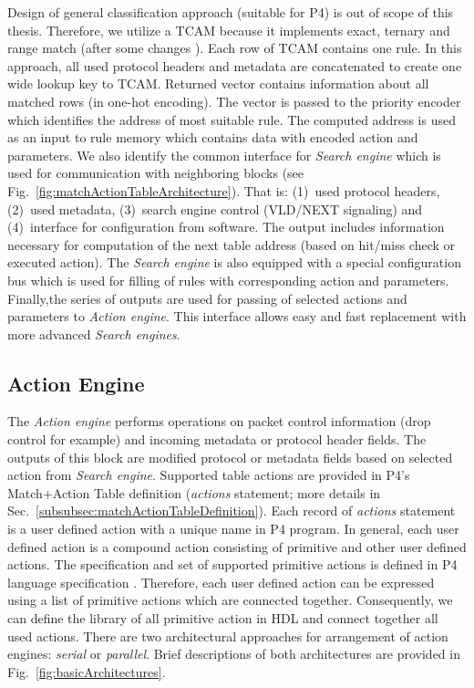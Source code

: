 Design of general classification approach (suitable for P4) is out of scope of this thesis. 
Therefore, we utilize a TCAM because
it implements exact, ternary and range match (after some changes \cite{MeinersClasssificationBook}).
Each row of TCAM contains one rule. In this approach, all used protocol headers and metadata are concatenated to create one wide lookup key to TCAM. 
Returned vector contains information about all matched rows (in one-hot encoding).
The vector is passed to the priority encoder which identifies the address of most suitable rule. The computed address is used as an input to rule memory 
which contains data with encoded action and parameters. 
We also identify the common interface for \textit{Search engine}
which is used for communication with neighboring blocks (see Fig.~\ref{fig:matchActionTableArchitecture}).
That is: (1)~used protocol headers, (2)~used metadata, (3)~search engine control (VLD/NEXT signaling) and (4)~interface for configuration from software. 
The output includes information necessary for computation of the next table address (based on hit/miss check or executed action). 
The \textit{Search engine} is also equipped with a special configuration bus which is used for filling of rules with corresponding action and parameters.
Finally,the series of outputs are used for passing of selected actions and parameters to \textit{Action engine}. This interface allows easy
and fast replacement with more advanced \textit{Search engines}. 

\subsection{Action Engine}
\label{sec:actionEngine}
The \textit{Action engine} performs operations on packet control information (drop control for example) and incoming metadata or protocol header fields.
The outputs of this block are modified protocol or metadata fields based on selected action from \textit{Search engine}.
Supported table actions are provided in P4's Match+Action Table definition (\textit{actions} statement; more details in 
Sec.~\ref{subsubsec:matchActionTableDefinition}).
Each record of \textit{actions} statement is a user defined action with a unique name in P4 program. 
In general, each user defined action is a compound action consisting of primitive and other user defined actions. 
The specification and set of supported primitive actions is defined in P4 language specification \cite{p4languagespec}. 
Therefore, each user defined action can be expressed using a list of primitive actions which are connected together. 
Consequently, we can define the library of all primitive action in HDL and connect together all used actions.
There are two architectural approaches for arrangement of action engines: \textit{serial} or \textit{parallel}.
Brief descriptions of both architectures are provided in Fig.~\ref{fig:basicArchitectures}.

